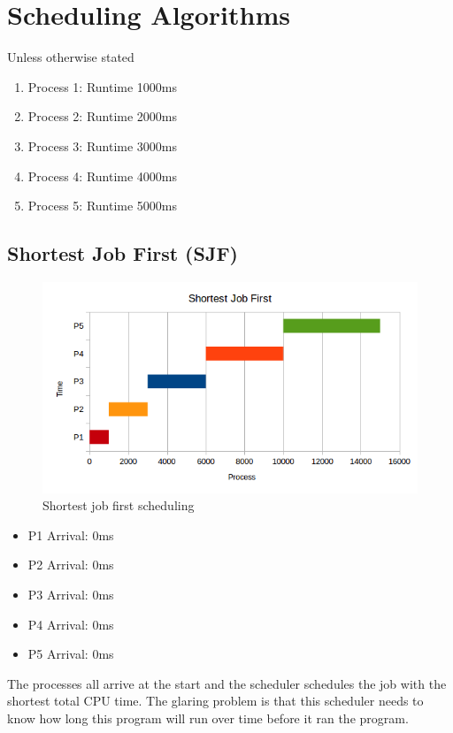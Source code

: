 \section{Scheduling Algorithms}

Unless otherwise stated

\begin{enumerate}
\item Process 1: Runtime 1000ms
\item Process 2: Runtime 2000ms
\item Process 3: Runtime 3000ms
\item Process 4: Runtime 4000ms
\item Process 5: Runtime 5000ms
\end{enumerate}

\subsection{Shortest Job First (SJF)}

\begin{figure}[htbp]
\centering
\includegraphics[width=\textwidth]{scheduling/images/sjf.png}
\caption{Shortest job first scheduling}
\end{figure}

\begin{itemize}
\tightlist
\item
  P1 Arrival: 0ms
\item
  P2 Arrival: 0ms
\item
  P3 Arrival: 0ms
\item
  P4 Arrival: 0ms
\item
  P5 Arrival: 0ms
\end{itemize}

The processes all arrive at the start and the scheduler schedules the job with the shortest total CPU time.
The glaring problem is that this scheduler needs to know how long this program will run over time before it ran the program.

